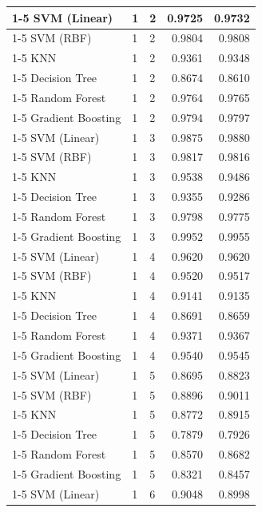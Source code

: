 \begin{table}
\begin{tabular}{lllrr}
\cline{1-5} \cline{2-5}
SVM (Linear) & 1 & 2 & 0.9725 & 0.9732 \\
\cline{1-5} \cline{2-5}
SVM (RBF) & 1 & 2 & 0.9804 & 0.9808 \\
\cline{1-5} \cline{2-5}
KNN & 1 & 2 & 0.9361 & 0.9348 \\
\cline{1-5} \cline{2-5}
Decision Tree & 1 & 2 & 0.8674 & 0.8610 \\
\cline{1-5} \cline{2-5}
Random Forest & 1 & 2 & 0.9764 & 0.9765 \\
\cline{1-5} \cline{2-5}
Gradient Boosting & 1 & 2 & 0.9794 & 0.9797 \\
\cline{1-5} \cline{2-5}
SVM (Linear) & 1 & 3 & 0.9875 & 0.9880 \\
\cline{1-5} \cline{2-5}
SVM (RBF) & 1 & 3 & 0.9817 & 0.9816 \\
\cline{1-5} \cline{2-5}
KNN & 1 & 3 & 0.9538 & 0.9486 \\
\cline{1-5} \cline{2-5}
Decision Tree & 1 & 3 & 0.9355 & 0.9286 \\
\cline{1-5} \cline{2-5}
Random Forest & 1 & 3 & 0.9798 & 0.9775 \\
\cline{1-5} \cline{2-5}
Gradient Boosting & 1 & 3 & 0.9952 & 0.9955 \\
\cline{1-5} \cline{2-5}
SVM (Linear) & 1 & 4 & 0.9620 & 0.9620 \\
\cline{1-5} \cline{2-5}
SVM (RBF) & 1 & 4 & 0.9520 & 0.9517 \\
\cline{1-5} \cline{2-5}
KNN & 1 & 4 & 0.9141 & 0.9135 \\
\cline{1-5} \cline{2-5}
Decision Tree & 1 & 4 & 0.8691 & 0.8659 \\
\cline{1-5} \cline{2-5}
Random Forest & 1 & 4 & 0.9371 & 0.9367 \\
\cline{1-5} \cline{2-5}
Gradient Boosting & 1 & 4 & 0.9540 & 0.9545 \\
\cline{1-5} \cline{2-5}
SVM (Linear) & 1 & 5 & 0.8695 & 0.8823 \\
\cline{1-5} \cline{2-5}
SVM (RBF) & 1 & 5 & 0.8896 & 0.9011 \\
\cline{1-5} \cline{2-5}
KNN & 1 & 5 & 0.8772 & 0.8915 \\
\cline{1-5} \cline{2-5}
Decision Tree & 1 & 5 & 0.7879 & 0.7926 \\
\cline{1-5} \cline{2-5}
Random Forest & 1 & 5 & 0.8570 & 0.8682 \\
\cline{1-5} \cline{2-5}
Gradient Boosting & 1 & 5 & 0.8321 & 0.8457 \\
\cline{1-5} \cline{2-5}
SVM (Linear) & 1 & 6 & 0.9048 & 0.8998 \\

\end{tabular}
\end{table}
